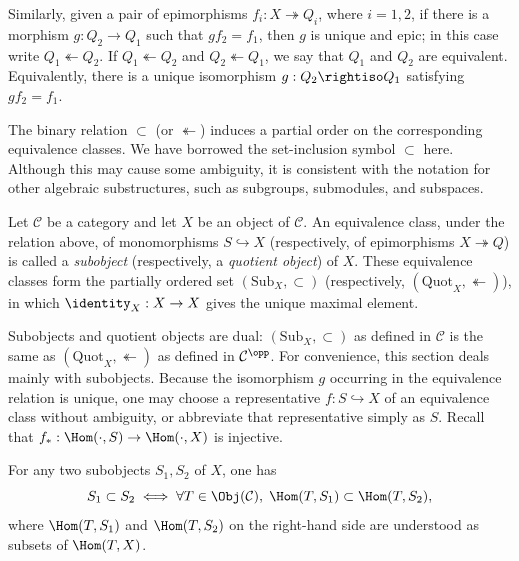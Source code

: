 Similarly, given a pair of epimorphisms $f_i:X\twoheadrightarrow Q_i$, where
$i=1,2$, if there is a morphism $g:Q_2\to Q_1$ such that $gf_2=f_1$, then
$g$ is unique and epic; in this case write $Q_1\twoheadleftarrow Q_2$. If
$Q_1\twoheadleftarrow Q_2$ and $Q_2\twoheadleftarrow Q_1$, we say that $Q_1$
and $Q_2$ are equivalent. Equivalently, there is a unique isomorphism
$g:Q_2\rightiso Q_1$ satisfying $gf_2=f_1$.

The binary relation $\subset$ (or $\twoheadleftarrow$) induces a partial order
on the corresponding equivalence classes. We have borrowed the set-inclusion
symbol $\subset$ here. Although this may cause some ambiguity, it is consistent
with the notation for other algebraic substructures, such as subgroups,
submodules, and subspaces.

\begin{definition}\label{def:sub-quot-obj}
	 
	 
	Let $\mathcal C$ be a category and let $X$ be an object of $\mathcal C$.
	An equivalence class, under the relation above, of monomorphisms
	$S\hookrightarrow X$ (respectively, of epimorphisms
	$X\twoheadrightarrow Q$) is called a \emph{subobject} (respectively, a
	\emph{quotient object}) of $X$. These equivalence classes form the
	partially ordered set $(\mathrm{Sub}_X,\subset)$ (respectively,
	$(\mathrm{Quot}_X,\twoheadleftarrow)$), in which
	$\identity_X:X\to X$ gives the unique maximal element.
\end{definition}

Subobjects and quotient objects are dual: $(\mathrm{Sub}_X,\subset)$ as
defined in $\mathcal C$ is the same as
$(\mathrm{Quot}_X,\twoheadleftarrow)$ as defined in $\mathcal C^{\opp}$.
For convenience, this section deals mainly with subobjects. Because the
isomorphism $g$ occurring in the equivalence relation is unique, one may
choose a representative $f:S\hookrightarrow X$ of an equivalence class
without ambiguity, or abbreviate that representative simply as $S$. Recall
that $f_*:\Hom(\cdot,S)\to\Hom(\cdot,X)$ is injective.

\begin{lemma}\label{prop:subobject-order}
	For any two subobjects $S_1,S_2$ of $X$, one has
	\begin{equation*}
		S_1 \subset S_2 \iff \forall T \in \Obj(\mathcal{C}), \; \Hom(T, S_1) \subset \Hom(T, S_2),
	\end{equation*}
	where $\Hom(T,S_1)$ and $\Hom(T,S_2)$ on the right-hand side are
	understood as subsets of $\Hom(T,X)$.
\end{lemma}

